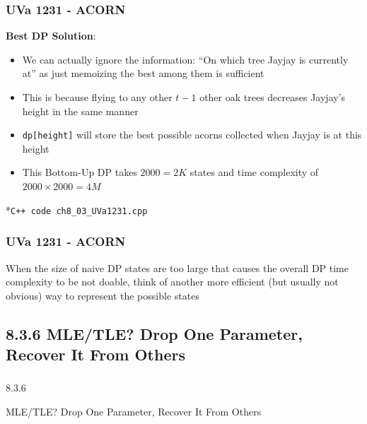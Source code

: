 \documentclass{beamer}
\begin{document}
\begin{frame}[fragile]
\frametitle{UVa 1231 - ACORN}

\textbf{Best DP Solution}:

\vspace{0.3cm}

\begin{itemize}
    \item We can actually ignore the information: “On which tree Jayjay is currently at” as just memoizing the best among them is sufficient
    
    \pause
    \item This is because flying to any other $t-1$ other oak trees decreases Jayjay’s height in the same manner
    
    \pause
    \item \verb|dp[height]| will store the best possible acorns collected when Jayjay is at this height
    
    \item This Bottom-Up DP takes $2000 = 2K$ states and time complexity of $2000 \times 2000 = 4M$
\end{itemize}

\vspace{0.3cm}

\color{blue}*\verb|C++ code ch8_03_UVa1231.cpp|\color{black}

\end{frame}

\begin{frame}[fragile]
\frametitle{UVa 1231 - ACORN}

When the size of naive DP states are too large that causes the overall DP time complexity to be not doable, think of another more efficient (but usually not obvious) way to represent the possible states

\end{frame}


\subsection{8.3.6 MLE/TLE? Drop One Parameter, Recover It From Others}

\begin{frame}
\frametitle{}
\color{blue}
\centerline{\Large{8.3.6}}
\vspace{0.3cm} 
\centerline{\Large{MLE/TLE? Drop One Parameter, Recover It From Others}}
\color{black}
\end{frame}
\end{document}
